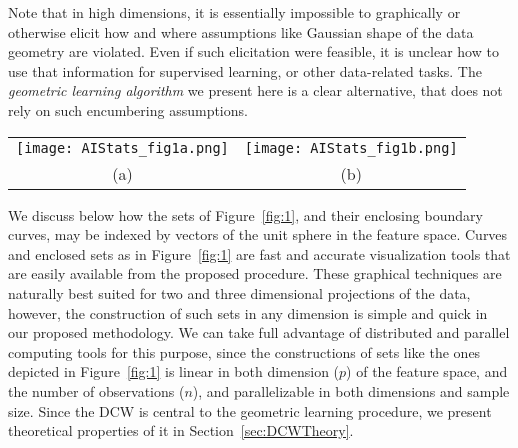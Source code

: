 \documentclass[twoside]{article}
\begin{document}
Note that in high dimensions, it is 
essentially impossible to graphically or otherwise elicit how and where assumptions like 
Gaussian shape of the data geometry are violated. Even if such elicitation were feasible, 
it is unclear how to use that information for supervised learning, or other data-related 
tasks. The {\it geometric learning algorithm} we present here is a clear alternative, 
that does not rely on such encumbering assumptions. 



\begin{figure*}[htb]
\centering 
\begin{tabular}{cc}
\texttt{[image: AIStats\_fig1a.png]} &
\texttt{[image: AIStats\_fig1b.png]} \\
(a) & (b)  \\
\end{tabular}
\caption{Comparison of usual projection quantiles (blue) 
with weighted projection quantiles (red), 
along with a Gaussian confidence ellipsoid (black) for a Gaussian scatter in (a) 
and mixture of Gaussians in (b). 
Areas under the different curves are not expected to 
be equal.}
\label{fig:1}
\end{figure*}


We discuss below how the sets of Figure~\ref{fig:1}, 
 and their enclosing boundary curves, may be indexed by vectors of the 
unit sphere in the feature space. 
Curves and enclosed sets as in Figure~\ref{fig:1} are fast and accurate visualization 
tools that are easily available from the proposed procedure. These graphical techniques 
are naturally best suited for two and three dimensional projections of the data, however, 
the construction of such sets in any dimension is simple and quick in our proposed 
methodology. We can take full advantage of distributed and parallel computing tools 
for  this purpose, since the constructions of sets like the ones depicted in 
Figure~\ref{fig:1} is linear in both dimension ($p$) of the feature space, and 
the number of observations ($n$), and parallelizable in both dimensions and sample size. 
Since the DCW is central to the geometric learning procedure, 
we present theoretical properties of it 
in Section~\ref{sec:DCWTheory}.  
\end{document}
